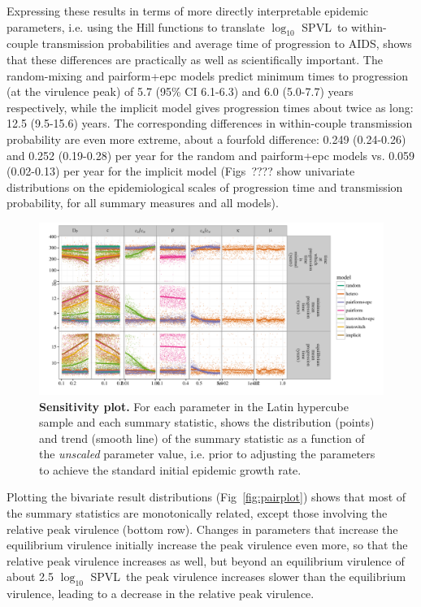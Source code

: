 \documentclass[10pt,letterpaper]{article}
\renewcommand{\figurename}{Fig}
\newcommand{\Lspvl}{$\log_{10}$ SPVL}
\begin{document}
Expressing these results in terms of more directly interpretable epidemic
parameters, i.e. using the Hill functions to translate \Lspvl\ to
within-couple transmission probabilities and average time of progression
to AIDS, shows that these differences are practically as well as 
scientifically important. The random-mixing and pairform+epc models
predict minimum times to progression (at the virulence peak) of
5.7 (95\% CI 6.1-6.3) and 6.0 (5.0-7.7) years respectively, while
the implicit model gives progression times about twice as long:
12.5 (9.5-15.6) years. The corresponding differences in 
within-couple transmission
probability are even more extreme, about a fourfold difference:
0.249 (0.24-0.26) and 0.252 (0.19-0.28) per year for the 
random and pairform+epc models vs. 0.059 (0.02-0.13) per year
for the implicit model (Figs~???? show univariate distributions
on the epidemiological scales
of progression time and transmission probability,
for all summary measures and all models).

\begin{figure}[!ht]
\includegraphics[width=\textwidth]{../figures/fig5.pdf}
\caption{{\bf Sensitivity plot.}
For each parameter in the Latin hypercube sample and each summary statistic, shows the distribution (points) and trend (smooth line) of the summary statistic as a function of the \emph{unscaled} parameter value, i.e. prior to adjusting the parameters to achieve the standard initial epidemic growth rate.}
\label{fig:plot_sens}
\end{figure}

Plotting the bivariate result distributions (\figurename~\ref{fig:pairplot})
shows that most of the summary statistics
are monotonically related, except those involving the relative peak virulence
(bottom row). Changes in parameters that increase the equilibrium
virulence initially increase the peak virulence even more, so
that the relative peak virulence increases as well, but beyond
an equilibrium virulence of about 2.5 \Lspvl\ the peak virulence
increases slower than the equilibrium virulence, leading to a
decrease in the relative peak virulence.
\end{document}
